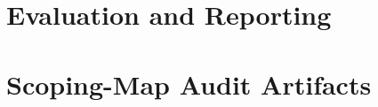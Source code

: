 \documentclass[11pt]{article}
\begin{document}
\FloatBarrier
\section{Evaluation and Reporting}
\label{sec:appendix-eval}




\FloatBarrier
\section{Scoping-Map Audit Artifacts}
\label{sec:audit-artifacts}





\FloatBarrier
\end{document}
